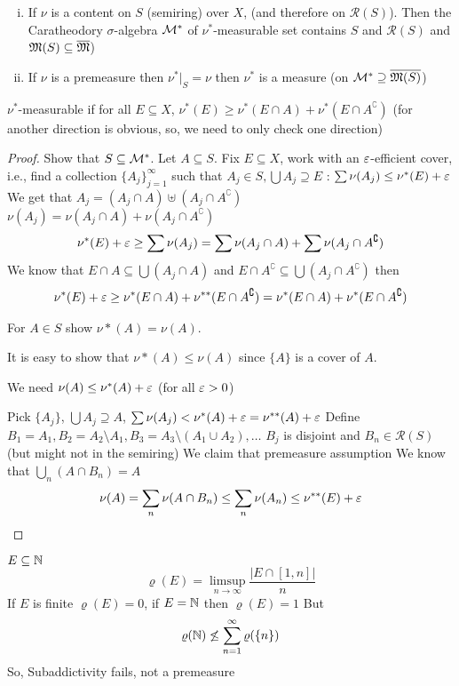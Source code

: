\begin{theorem} 
  \begin{enumerate}[(i)]
    \item If $\nu$ is a content on $S$ (semiring) over $X$, (and therefore on $\mathcal{R}(S)$).  
      Then the Caratheodory $\sigma$-algebra $\mathcal M^*$ of $\nu^*$-measurable set contains $S$ {and $\mathcal{R}(S)$} and $\mathfrak M(S) \subseteq \overline{\mathfrak M}$)
    \item If $\nu$ is a premeasure then $\nu^*|_{S} = \nu$
    then $\nu^*$ is a measure (on $\mathcal M^* \supseteq \overline{\mathfrak M(S)}$)
  \end{enumerate}
\end{theorem}

$\nu^*$-measurable if for all $E \subseteq X$, $\nu^*(E) \ge \nu^*(E \cap A) + \nu^*(E \cap A^\complement)$
(for another direction is obvious, so, we need to only check one direction)

\begin{proof}
  Show that $S \subseteq \mathcal M^*$. Let $A \subseteq S$. 
  Fix $E \subseteq X$, work with an $\varepsilon$-efficient cover, i.e.,
  find a collection $\{A_j\}_{j=1}^\infty$ such that $A_j \in S, \bigcup A_j \supseteq E$ : 
  $\sum \nu(A_j) \le \nu^*(E) + \varepsilon$
  We get that $A_j = (A_j \cap A) \uplus (A_j \cap A^\complement)$
  $\nu(A_j) = \nu(A_j \cap A) + \nu(A_j \cap A^\complement)$
  \[\nu^*(E) + \varepsilon \ge \sum \nu(A_j) = \sum \nu(A_j \cap A) + \sum \nu(A_j \cap A^\complement) \]
  We know that $E \cap A \subseteq \bigcup (A_j \cap A)$ and $E \cap A^\complement \subseteq \bigcup (A_j \cap A^\complement)$
  then 
  \begin{align*}
   \nu^*(E) + \varepsilon \ge \nu^*(E \cap A) + \nu^{**}(E \cap A^\complement) = \nu^*(E \cap A) + \nu^*(E \cap A^\complement)
  \end{align*}

  For $A \in S$ show $\nu*(A) = \nu(A)$.

  It is easy to show that $\nu*(A) \le \nu(A)$ since $\{A\}$ is a cover of $A$.

  We need $\nu(A) \le \nu^*(A) + \varepsilon$ (for all $\varepsilon > 0$)

  Pick $\{A_j\}$, $\bigcup A_j \supseteq A$, $\sum \nu(A_j) < \nu^*(A) + \varepsilon = \nu^{**}(A) + \varepsilon$
  Define $B_1 = A_1, B_2 = A_2 \setminus A_1, B_3 = A_3 \setminus (A_1 \cup A_2), \dotsc$ $B_j$ is disjoint and $B_n \in \mathcal{R}(S)$ (but might not in the semiring)
  We claim that premeasure assumption
  We know that $\bigcup_n (A \cap B_n) = A$
  \[\nu(A) = \sum_n \nu(A\cap B_n) \le \sum_n \nu(A_n) \le \nu^{**}(E) + \varepsilon\]
\end{proof}

\begin{example}
  $E \subseteq \mathbb N$ 
  \[\varrho(E) = \limsup_{n\to\infty} \frac{|E \cap [1, n]|}n\]
  If $E$ is finite $\varrho(E) = 0$, if $E = \mathbb N$ then $\varrho(E) = 1$
  But 
  \[\varrho(\mathbb N) \not\le \sum_{n=1}^\infty \varrho(\{n\})\]
  So, Subaddictivity fails, not a premeasure
\end{example}
